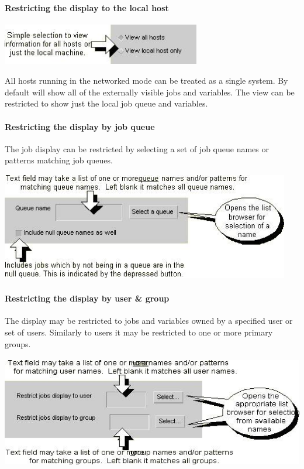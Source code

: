 \paragraph{Restricting the display to the local host}
 \includegraphics[width=8.668cm,height=1.796cm]{img/ref28.jpg} 

All hosts running \ProductName{} in the networked mode can be treated as a single system. By default \XmbtqName{} will show all of the externally visible
jobs and variables. The view can be restricted to show just the local job queue and variables.

\paragraph{Restricting the display by job queue}
The job display can be restricted by selecting a set of job queue names or patterns matching job queues.

 \includegraphics[width=12.644cm,height=4.71cm]{img/ref29.jpg} 

\paragraph{Restricting the display by user \& group}
The display may be restricted to jobs and variables owned by a specified user or set of users. Similarly to users it may be restricted to one or
more primary groups.

 \includegraphics[width=13.748cm,height=4.895cm]{img/ref30.jpg} 


